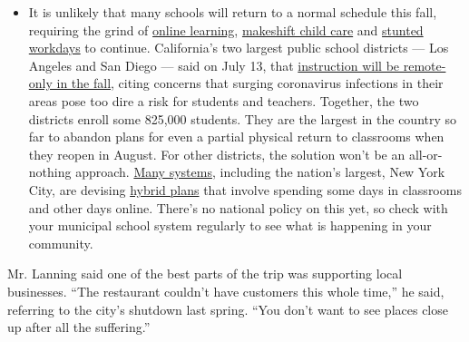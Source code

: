 \begin{itemize}
  \begin{itemize}
  \tightlist
  \item
    It is unlikely that many schools will return to a normal schedule
    this fall, requiring the grind of
    \href{https://www.nytimes.com/2020/06/05/us/coronavirus-education-lost-learning.html?action=click\&pgtype=Article\&state=default\&region=MAIN_CONTENT_3\&context=storylines_faq}{online
    learning},
    \href{https://www.nytimes.com/2020/05/29/us/coronavirus-child-care-centers.html?action=click\&pgtype=Article\&state=default\&region=MAIN_CONTENT_3\&context=storylines_faq}{makeshift
    child care} and
    \href{https://www.nytimes.com/2020/06/03/business/economy/coronavirus-working-women.html?action=click\&pgtype=Article\&state=default\&region=MAIN_CONTENT_3\&context=storylines_faq}{stunted
    workdays} to continue. California's two largest public school
    districts --- Los Angeles and San Diego --- said on July 13, that
    \href{https://www.nytimes.com/2020/07/13/us/lausd-san-diego-school-reopening.html?action=click\&pgtype=Article\&state=default\&region=MAIN_CONTENT_3\&context=storylines_faq}{instruction
    will be remote-only in the fall}, citing concerns that surging
    coronavirus infections in their areas pose too dire a risk for
    students and teachers. Together, the two districts enroll some
    825,000 students. They are the largest in the country so far to
    abandon plans for even a partial physical return to classrooms when
    they reopen in August. For other districts, the solution won't be an
    all-or-nothing approach.
    \href{https://bioethics.jhu.edu/research-and-outreach/projects/eschool-initiative/school-policy-tracker/}{Many
    systems}, including the nation's largest, New York City, are
    devising
    \href{https://www.nytimes.com/2020/06/26/us/coronavirus-schools-reopen-fall.html?action=click\&pgtype=Article\&state=default\&region=MAIN_CONTENT_3\&context=storylines_faq}{hybrid
    plans} that involve spending some days in classrooms and other days
    online. There's no national policy on this yet, so check with your
    municipal school system regularly to see what is happening in your
    community.
  \end{itemize}
\end{itemize}

Mr. Lanning said one of the best parts of the trip was supporting local
businesses. ``The restaurant couldn't have customers this whole time,''
he said, referring to the city's shutdown last spring. ``You don't want
to see places close up after all the suffering.''

